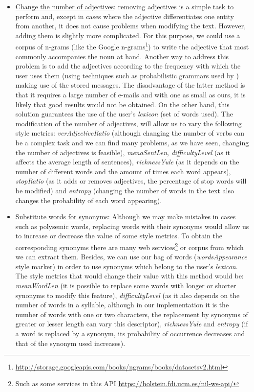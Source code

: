 \begin{itemize}
	\item \underline{Change the number of adjectives}: removing adjectives is a simple task to perform and, except in cases where the adjective differentiates one entity from another, it does not cause problems when modifying the text. However, adding them is slightly more complicated. For this purpose, we could use a corpus of n-grams (like the Google n-grams\footnote{\url{http://storage.googleapis.com/books/ngrams/books/datasetsv2.html}}) to write the adjective that most commonly accompanies the noun at hand. Another way to address this problem is to add the adjectives according to the frequency with which the user uses them (using techniques such as probabilistic grammars used by \cite{halliday2014corpus}) making use of the stored messages. The disadvantage of the latter method is that it requires a large number of e-mails and with one as small as ours, it is likely that good results would not be obtained. On the other hand, this solution guarantees the use of the user's \textit{lexicon} (set of words used). The modification of the number of adjectives, will allow us to vary the following style metrics: \textit{verAdjectiveRatio} (although changing the number of verbs can be a complex task and we can find many problems, as we have seen, changing the number of adjectives is feasible), \textit{menaSentLen}, \textit{difficultyLevel} (as it affects the average length of sentences), \textit{richnessYule} (as it depends on the number of different words and the amount of times each word appears), \textit{stopRatio} (as it adds or removes adjectives, the percentage of stop words will be modified) and \textit{entropy} (changing the number of words in the text also changes the probability of each word appearing).
	
	\item\underline{Substitute words for synonyms}: Although we may make mistakes in cases such as polysemic words, replacing words with their synonyms would allow us to increase or decrease the value of some style metrics. To obtain the corresponding synonyms there are many web services\footnote{Such as some services in this API \url{https://holstein.fdi.ucm.es/nil-ws-api/}} or corpus from which we can extract them. Besides, we can use our bag of words (\textit{wordsAppearance} style marker) in order to use synonyms which belong to the user's \textit{lexicon}. The style metrics that would change their value with this method would be: \textit{meanWordLen} (it is possible to replace some words with longer or shorter synonyms to modify this feature), \textit{difficultyLevel} (as it also depends on the number of words in a syllable, although in our implementation it is the number of words with one or two characters, the replacement by synonyms of greater or lesser length can vary this descriptor), \textit{richnessYule} and \textit{entropy} (if a word is replaced by a synonym, its probability of occurrence decreases and that of the synonym used increases).
	

\end{itemize}
